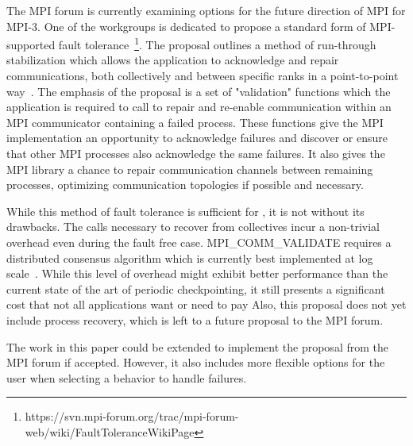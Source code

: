 The MPI forum is currently examining options for the future direction of MPI for
MPI-3. One of the workgroups is dedicated to propose a standard form of
MPI-supported fault
tolerance~\footnote{https://svn.mpi-forum.org/trac/mpi-forum-web/wiki/FaultToleranceWikiPage}.
The proposal outlines a method of run-through stabilization which allows the
application to acknowledge and repair communications, both collectively and
between specific ranks in a point-to-point way~\cite{Hursey11MPI3FT}. The
emphasis of the proposal is a set of "validation" functions which the
application is required to call to repair and re-enable communication within an
MPI communicator containing a failed process.
These functions give the MPI implementation an opportunity to acknowledge
failures and discover or ensure that other MPI processes also acknowledge the
same failures. It also gives the MPI library a chance to repair communication
channels between remaining processes, optimizing communication topologies if
possible and necessary.

While this method of fault tolerance is sufficient for \abft, it is not without
its drawbacks. The calls necessary to recover from collectives incur a
non-trivial overhead even during the fault free case. MPI\_COMM\_VALIDATE
requires a distributed consensus algorithm which is currently best implemented
at log scale~\cite{Hursey11LogConsensus}. While this level of overhead might
exhibit better performance
than the current state of the art of periodic checkpointing, it still presents a
significant cost that not all applications want or need to pay
 Also, this proposal does not yet include process
recovery, which is left to a future proposal to the MPI forum.

The work in this paper could be extended to implement the proposal from the
MPI forum if accepted. However, it also includes more flexible options for the user when
selecting a behavior to handle failures.
